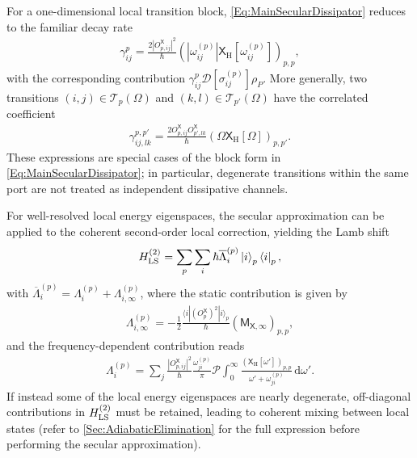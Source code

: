 \documentclass[prx,aps,twocolumn,article]{revtex4-2}
\newcommand{\msf}[1]{\mathsf{#1}}
\newcommand{\msM}{\msf{M}}
\newcommand{\msXH}{\msX_\mathrm{H}}
\newcommand{\msX}{\msf{X}}
\begin{document}
For a one-dimensional local transition block,
\cref{Eq:MainSecularDissipator} reduces to the familiar decay rate
\begin{align}
    \gamma_{ij}^{p}
    =
    \frac{
        2|O_{p,ij}^{\msX}|^2
    }{\hbar}
    \left(
        |\omega_{ij}^{(p)}|
        \msXH[
            \omega_{ij}^{(p)}
        ]
    \right)_{p,p},
\label{Eq:LocalDecay}
\end{align}
with the corresponding contribution
$\gamma_{ij}^{p}\mathcal D[\sigma_{ij}^{(p)}]\rho_P$.
More generally, two transitions
$(i,j)\in\mathcal T_p(\Omega)$ and
$(k,l)\in\mathcal T_{p'}(\Omega)$ have the correlated coefficient
\begin{align}
    \gamma_{ij,lk}^{p,p'}
    =
    \frac{
        2
        O_{p,ij}^{\msX}
        O_{p',lk}^{\msX}
    }{\hbar}
    \left(
        \Omega
        \msXH[\Omega]
    \right)_{p,p'}.
\label{Eq:CorrelatedDecay}
\end{align}
These expressions are special cases of the block form in
\cref{Eq:MainSecularDissipator}; in particular, degenerate transitions
within the same port are not treated as independent dissipative channels.

For well-resolved local energy eigenspaces, the secular approximation can be applied to the coherent second-order local correction, yielding the Lamb shift
\begin{align}
    H_{\rm LS}^{(2)}
    =
    \sum_p\sum_i
    \hbar\overline{\Lambda}_{i}^{(p)}
    \ket{i}_p\bra{i}_p,
\end{align}
with
$\overline{\Lambda}_{i}^{(p)}
=\Lambda_i^{(p)}+\Lambda_{i,\infty}^{(p)}$, where the static contribution is given by 
\begin{align}
\Lambda_{i,\infty}^{(p)}
=
-\frac{1}{2}
\frac{
    \langle i|
    (O_p^{\msX})^2
    |i\rangle_p
}{\hbar}
\left(
    \msM_{\msX,\infty}
\right)_{p,p},
\label{Eq:LambRenormalization}
\end{align}
and the frequency-dependent contribution reads
\begin{align}
\Lambda_i^{(p)}
=
\sum_j
\frac{|O_{p,ij}^{\msX}|^2}{\hbar}
\frac{\omega_{ji}^{(p)}}{\pi}
\mathcal P\!\int_0^\infty
\frac{
    \left(
        \msXH[\omega']
    \right)_{p,p}
}{
    \omega'+\omega_{ji}^{(p)}
}
\,\mathrm d\omega'.
\label{Eq:LambShift}
\end{align}
If instead some of the local energy eigenspaces are nearly degenerate, off-diagonal contributions in $H_{\rm LS}^{(2)}$ must be retained, leading to coherent mixing between local states (refer to \cref{Sec:AdiabaticElimination} for the full expression before performing the secular approximation).
\end{document}
